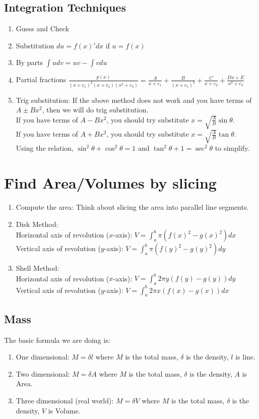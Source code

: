 \documentclass[12pt]{article}
\theoremstyle{definition}
\theoremstyle{definition}
\theoremstyle{remark}
\theoremstyle{definition}
\theoremstyle{definition}
\theoremstyle{definition}
\begin{document}
\subsection{Integration Techniques}
\begin{enumerate}
	\item Guess and Check
	\item Substitution $du=f(x)'dx$ if $u=f(x)$
	\item By parts $\int u dv=uv-\int v du$
	\item Partial fractions $\frac{p(x)}{(x+c_1)^2(x+c_2)(x^2+c_3)}=\frac{A}{x+c_1}+\frac{B}{(x+c_1)^2}+\frac{C}{x+c_2}+ \frac{Dx+E}{x^2+c_3}$
	\item Trig substitution:
	If the above method does not work and you have terms of $A\pm Bx^{2}$, then we will do trig substitution.\\
If you have terms of $A-Bx^{2}$, you should try substitute $x=\sqrt{\frac{A}{B}}\sin \theta$.\\
If you have terms of $A+Bx^{2}$, you should try substitute $x=\sqrt{\frac{A}{B}}\tan \theta$.\\
Using the relation, $\sin^{2}\theta+\cos^{2}\theta=1$ and $\tan^{2}\theta+1=\sec^{2}\theta$ to simplify.
\end{enumerate}


\section{Find Area/Volumes by slicing}

\begin{enumerate}
	\item Compute the area: Think about slicing the area into parallel line segments.
	\item Disk Method:\\
	Horizontal axis of revolution ($x$-axis): $V = \int_a^b \pi(f(x)^2 - g(x)^2)dx$\\
	Vertical axis of revolution ($y$-axis): $V = \int_a^b \pi(f(y)^2 - g(y)^2)dy$
	\item Shell Method:\\
	Horizontal axis of revolution ($x$-axis): $V = \int_a^b 2\pi y(f(y) - g(y))dy$\\
		Vertical axis of revolution ($y$-axis): $V = \int_a^b 2\pi x(f(x) - g(x))dx$

\end{enumerate}

\subsection{Mass}
The basic formula we are doing is:\begin{enumerate}
\item One dimensional: $M=\delta l$ where $M$ is the total mass, $\delta$ is the density, $l$ is line.
\item
Two dimensional: $M=\delta A$ where $M$ is the total mass, $\delta$ is the density, $A$ is Area.
\item Three dimensional (real world): $M=\delta V$ where $M$ is the total mass, $\delta$ is the density, $V$ is Volume.
\end{enumerate}
\end{document}
